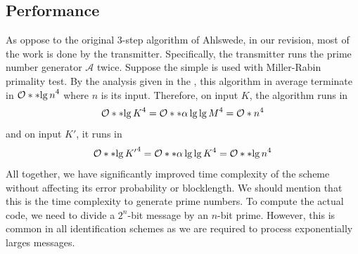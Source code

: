 \subsection{Performance}
As oppose to the original 3-step algorithm of Ahlswede, in our revision, most of the work is done by the transmitter. Specifically, the transmitter runs the prime number generator \(\mathcal{A}\) twice. Suppose the simple  is used with Miller-Rabin primality test. By the analysis given in the , this algorithm in average terminate in \(\bigO{\bracket{\lg n}^4}\) where \(n\) is its input. Therefore, on input \(K\), the algorithm runs in 
\begin{equation*}
    \bigO{\bracket{\lg K}^4} = \bigO{\bracket{\alpha \lg \lg M }^4} = \bigO{n^4}
\end{equation*}
and on input \(K'\), it runs in 
\begin{equation*}
    \bigO{\bracket{\lg K'}^4} = \bigO{\bracket{\alpha \lg \lg K }^4} = \bigO{\bracket{\lg n}^4}
\end{equation*}
All together, we have significantly improved time complexity of the scheme without affecting its error probability or blocklength. We should mention that this is the time complexity to generate prime numbers. To compute the actual code, we need to divide a \(2^n\)-bit message by an \(n\)-bit prime. However, this is common in all identification schemes as we are required to process exponentially larges messages. 
